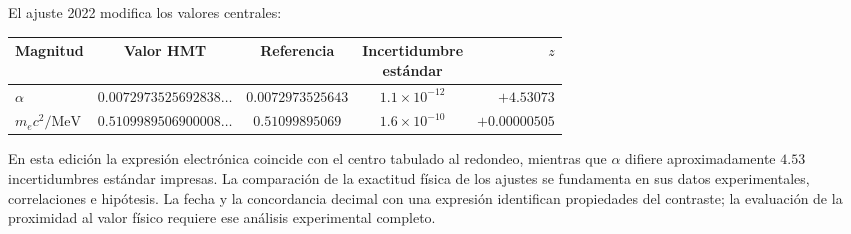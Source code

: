 El ajuste 2022 modifica los valores centrales\cite{codata2022}:
\begin{center}
\begin{tabular}{@{}lcccr@{}}\toprule
Magnitud&Valor HMT&Referencia&\shortstack{Incertidumbre\\estándar}&\(z\)\\\midrule
\(\alpha\)&\(0.0072973525692838\ldots\)&\(0.0072973525643\)&\(1.1\times10^{-12}\)&\(+4.53073\)\\
\(m_ec^2/\mathrm{MeV}\)&\(0.5109989506900008\ldots\)&\(0.51099895069\)&\(1.6\times10^{-10}\)&\(+0.00000505\)\\\bottomrule
\end{tabular}
\end{center}
En esta edición la expresión electrónica coincide con el centro tabulado al redondeo, mientras que \(\alpha\) difiere aproximadamente \(4.53\) incertidumbres estándar impresas. La comparación de la exactitud física de los ajustes se fundamenta en sus datos experimentales, correlaciones e hipótesis. La fecha y la concordancia decimal con una expresión identifican propiedades del contraste; la evaluación de la proximidad al valor físico requiere ese análisis experimental completo.


